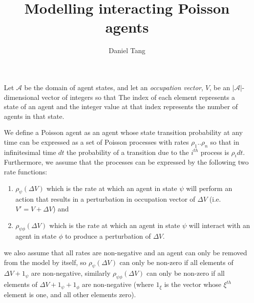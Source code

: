 \documentclass[a4paper]{article}
\title{Modelling interacting Poisson agents}
\author{Daniel Tang}
\begin{document}
\maketitle

Let $\mathcal{A}$ be the domain of agent states, and let an \textit{occupation vector}, $V$, be an $|\mathcal{A}|$-dimensional vector of integers so that The index of each element represents a state of an agent and the integer value at that index represents the number of agents in that state.

We define a Poisson agent as an agent whose state transition probability at any time can be expressed as a set of Poisson processes with rates $\rho_1..\rho_n$ so that in infinitesimal time $dt$ the probability of a transition due to the $i^{th}$ process is $\rho_i dt$. Furthermore, we assume that the processes can be expressed by the following two rate functions:
\begin{enumerate}
	\item $\rho_\psi(\Delta V)$ which is the rate at which an agent in state $\psi$ will perform an action that results in a perturbation in occupation vector of $\Delta V$ (i.e. $V' = V + \Delta V$) and
	\item $\rho_{\psi\phi}(\Delta V)$ which is the rate at which an agent in state $\psi$ will interact with an agent in state $\phi$ to produce a perturbation of $\Delta V$. 
\end{enumerate}


we also assume that all rates are non-negative and an agent can only be removed from the model by itself, so $\rho_\psi(\Delta V)$ can only be non-zero if all elements of $\Delta V + 1_\psi$ are non-negative, similarly $\rho_{\psi\phi}(\Delta V)$ can only be non-zero if all elements of $\Delta V + 1_\psi + 1_\phi$ are non-negative (where $1_\xi$ is the vector whose $\xi^{th}$ element is one, and all other elements zero).
\end{document}
